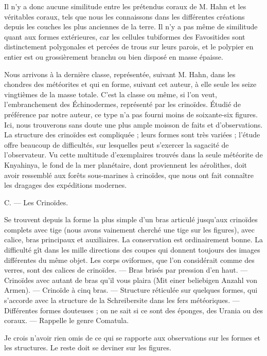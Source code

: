 \documentclass[a4paper, 12pt, oneside, french]{book}
\begin{document}
Il n'y a donc aucune similitude entre les prétendus coraux de M. Hahn et les véritables coraux, tels que nous les connaissons dans les différentes créations depuis les couches les plus anciennes de la terre. Il n'y a pas même de similitude quant aux formes extérieures, car les cellules tubiformes des Favositides sont distinctement polygonales et percées de trous sur leurs parois, et le polypier en entier est ou grossièrement branchu ou bien disposé en masse épaisse.

Nous arrivons à la dernière classe, représentée, suivant M. Hahn, dans les chondres des météorites et qui en forme, suivant cet auteur, à elle seule les seize vingtièmes de la masse totale. C'est la classe ou même, si l'on veut, l'embranchement des Échinodermes, représenté par les crinoïdes. Étudié de préférence par notre auteur, ce type n'a pas fourni moins de soixante-six figures. Ici, nous trouverons sans doute une plus ample moisson de faits et d'observations. La structure des crinoïdes est compliquée ; leurs formes sont très variées ; l'étude offre beaucoup de difficultés, sur lesquelles peut s'exercer la sagacité de l'observateur. Vu cette multitude d'exemplaires trouvés dans la seule météorite de Knyahinya, le fond de la mer planétaire, dont proviennent les aérolithes, doit avoir ressemblé aux forêts sous-marines à crinoïdes, que nous ont fait connaître les dragages des expéditions modernes.

\og C. --- Les Crinoïdes. \fg

\og Se trouvent depuis la forme la plus simple d'un bras articulé jusqu'aux crinoïdes complets avec tige (nous avons vainement cherché une tige sur les figures), avec calice, bras principaux et auxiliaires. La conservation est ordinairement bonne. La difficulté gît dans les mille directions des coupes qui donnent toujours des images différentes du même objet. Les corps oviformes, que l'on considérait comme des verres, sont des calices de crinoïdes. \fg --- \og Bras brisés par pression d'en haut. \fg --- \og Crinoïdes avec autant de bras qu'il vous plaira \fg (Mit einer beliebigen Anzahl von Armen). --- \og Crinoïde à cinq bras. \fg --- \og Structure réticulée sur quelques formes, qui s'accorde avec la structure de la Schreibersite dans les fers météoriques. \fg --- \og Différentes formes douteuses ; on ne sait si ce sont des éponges, des Urania ou des coraux. \fg --- \og Rappelle le genre Comatula. \fg

Je crois n'avoir rien omis de ce qui se rapporte aux observations sur les formes et les structures. Le reste doit se deviner sur les figures.
\end{document}
